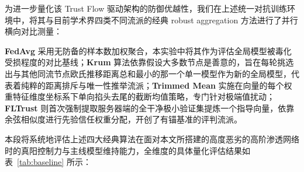 \documentclass[11pt, a4paper, UTF8, fontset=fandol]{ctexart}
\begin{document}
为进一步量化该 Trust Flow 驱动架构的防御优越性，我们在上述统一对抗训练环境中，将其与目前学术界四类不同流派的经典 robust aggregation 方法进行了并行横向对比测量：

\textbf{FedAvg}\cite{mcmahan2017fedavg} 采用无防备的样本数加权聚合，本实验中将其作为评估全局模型被毒化受损程度的对比基线；\textbf{Krum}\cite{blanchard2017krum} 算法依靠假设大多数节点是善意的，旨在每轮挑选出与其他同流节点欧氏推移距离总和最小的那一个单一模型作为新的全局模型，代表着纯粹的距离排斥与唯一性推举流派；\textbf{Trimmed Mean}\cite{yin2018byzantine} 实施在向量的每个权重特征维度坐标系下单向掐头去尾的截断均值策略，专门针对极端值扰动；\textbf{FLTrust}\cite{cao2021fltrust} 则首次强制提取服务器端的全干净极小验证集提炼一个指导向量，依靠余弦相似度进行先验信任权重分配，开创了有锚基准的评判流派。

本段将系统地评估上述四大经典算法在面对本文所搭建的高度恶劣的高阶渗透网络时的真阳控制力与主线模型维持能力，全维度的具体量化评估结果如表~\ref{tab:baseline} 所示：
\end{document}
